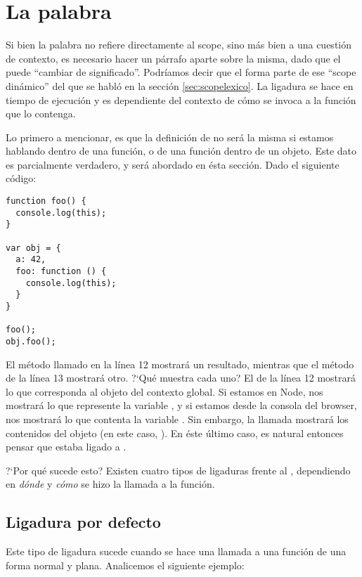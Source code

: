 \section{La palabra }
\label{sec:scopethis}

Si bien la palabra  no refiere directamente al scope, sino más bien a una cuestión de contexto, es necesario hacer un párrafo aparte sobre la misma, dado que el  puede "`cambiar de significado"'. Podríamos decir que el  forma parte de ese "`scope dinámico"' del que se habló en la sección \ref{sec:scopelexico}. La ligadura se hace en tiempo de ejecución y es dependiente del contexto de cómo se invoca a la función que lo contenga.

Lo primero a mencionar, es que la definición de  no será la misma si estamos hablando dentro de una función, o de una función dentro de un objeto. Este dato es parcialmente verdadero, y será abordado en ésta sección. Dado el siguiente código:

\begin{lstlisting}[title={Analizando \code{this}}]
function foo() {
  console.log(this);
}

var obj = {
  a: 42,
  foo: function () {
    console.log(this);
  }
}

foo();
obj.foo();
\end{lstlisting}

El método  llamado en la línea 12 mostrará un resultado, mientras que el método  de la línea 13 mostrará otro. ?`Qué muestra cada uno? El de la línea 12 mostrará lo que corresponda al objeto del contexto global. Si estamos en Node, nos mostrará lo que represente la variable , y si estamos desde la consola del browser, nos mostrará lo que contenta la variable . Sin embargo, la llamada  mostrará los contenidos del objeto  (en este caso, ). En éste último caso, es natural entonces pensar que  estaba ligado a .

?`Por qué sucede esto? Existen cuatro tipos de ligaduras frente al , dependiendo en \textit{dónde} y \textit{cómo} se hizo la llamada a la función.

\subsection{Ligadura por defecto}

Este tipo de ligadura sucede cuando se hace una llamada a una función de una forma normal y plana. Analicemos el siguiente ejemplo:

